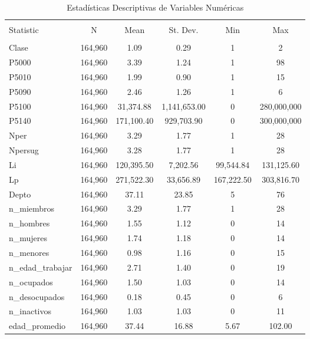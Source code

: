 
\begin{table}[!htbp] \centering 
  \caption{Estadísticas Descriptivas de Variables Numéricas} 
  \label{tab:descriptive_stats} 
\begin{tabular}{@{\extracolsep{5pt}}lccccc} 
\\[-1.8ex]\hline 
\hline \\[-1.8ex] 
Statistic & \multicolumn{1}{c}{N} & \multicolumn{1}{c}{Mean} & \multicolumn{1}{c}{St. Dev.} & \multicolumn{1}{c}{Min} & \multicolumn{1}{c}{Max} \\ 
\hline \\[-1.8ex] 
Clase & 164,960 & 1.09 & 0.29 & 1 & 2 \\ 
P5000 & 164,960 & 3.39 & 1.24 & 1 & 98 \\ 
P5010 & 164,960 & 1.99 & 0.90 & 1 & 15 \\ 
P5090 & 164,960 & 2.46 & 1.26 & 1 & 6 \\ 
P5100 & 164,960 & 31,374.88 & 1,141,653.00 & 0 & 280,000,000 \\ 
P5140 & 164,960 & 171,100.40 & 929,703.90 & 0 & 300,000,000 \\ 
Nper & 164,960 & 3.29 & 1.77 & 1 & 28 \\ 
Npersug & 164,960 & 3.28 & 1.77 & 1 & 28 \\ 
Li & 164,960 & 120,395.50 & 7,202.56 & 99,544.84 & 131,125.60 \\ 
Lp & 164,960 & 271,522.30 & 33,656.89 & 167,222.50 & 303,816.70 \\ 
Depto & 164,960 & 37.11 & 23.85 & 5 & 76 \\ 
n\_miembros & 164,960 & 3.29 & 1.77 & 1 & 28 \\ 
n\_hombres & 164,960 & 1.55 & 1.12 & 0 & 14 \\ 
n\_mujeres & 164,960 & 1.74 & 1.18 & 0 & 14 \\ 
n\_menores & 164,960 & 0.98 & 1.16 & 0 & 15 \\ 
n\_edad\_trabajar & 164,960 & 2.71 & 1.40 & 0 & 19 \\ 
n\_ocupados & 164,960 & 1.50 & 1.03 & 0 & 14 \\ 
n\_desocupados & 164,960 & 0.18 & 0.45 & 0 & 6 \\ 
n\_inactivos & 164,960 & 1.03 & 1.03 & 0 & 11 \\ 
edad\_promedio & 164,960 & 37.44 & 16.88 & 5.67 & 102.00 \\ 

\end{tabular}
\end{table}
